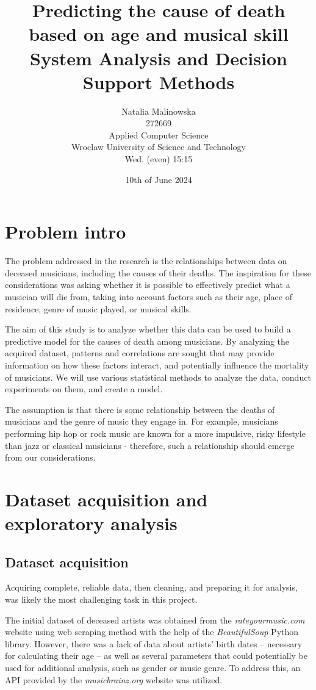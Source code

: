 \documentclass{article}
\title{\Huge\textbf{\color{pinkish}Predicting the cause of death based on age and musical skill} \\
    \LARGE \textbf{{System Analysis and Decision Support Methods}}}
\author{
    Natalia Malinowska \\
    272669 \\
    Applied Computer Science \\
    Wroclaw University of Science and Technology\\
    Wed. (even) 15:15
}
\date{10th of June 2024}
\begin{document}
\begin{titlepage}
    \maketitle
    \thispagestyle{empty} 
\end{titlepage}

\tableofcontents


\clearpage
\section{Problem intro}

The problem addressed in the research is the relationships between data on deceased musicians, including the causes of their deaths. The inspiration for these considerations was asking whether it is possible to effectively predict what a musician will die from, taking into account factors such as their age, place of residence, genre of music played, or musical skills.

The aim of this study is to analyze whether this data can be used to build a predictive model for the causes of death among musicians. By analyzing the acquired dataset, patterns and correlations are sought that may provide information on how these factors interact, and potentially influence the mortality of musicians. We will use various statistical methods to analyze the data, conduct experiments on them, and create a model.

The assumption is that there is some relationship between the deaths of musicians and the genre of music they engage in. For example, musicians performing hip hop or rock music are known for a more impulsive, risky lifestyle than jazz or classical musicians - therefore, such a relationship should emerge from our considerations.


\section{Dataset acquisition and exploratory analysis}


\subsection{Dataset acquisition}

Acquiring complete, reliable data, then cleaning, and preparing it for analysis, was likely the most challenging task in this project.

The initial dataset of deceased artists was obtained from the \textit{rateyourmusic.com} website using web scraping method with the help of the \textit{BeautifulSoup} Python library. However, there was a lack of data about artists' birth dates – necessary for calculating their age – as well as several parameters that could potentially be used for additional analysis, such as gender or music genre. To address this, an API provided by the \textit{musicbrainz.org} website was utilized.
\end{document}
